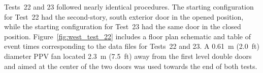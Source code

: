 Tests~22 and 23 followed nearly identical procedures. The starting configuration for Test~22 had the second-story, south exterior door in the opened position, while the starting configuration for Test~23 had the same door in the closed position. Figure~\ref{fig:west_test_22} includes a floor plan schematic and table of event times corresponding to the data files for Tests~22 and 23. A 0.61~m (2.0~ft) diameter PPV fan located 2.3~m (7.5~ft) away from the first level double doors and aimed at the center of the two doors was used towards the end of both tests.

